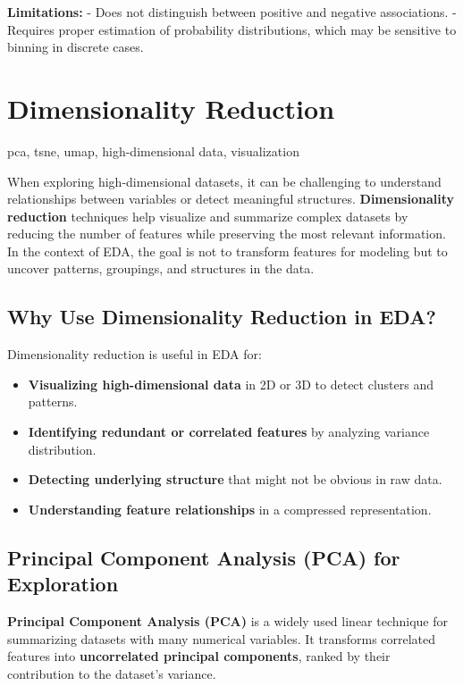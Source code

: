 \documentclass[12pt,openany]{book}
\begin{document}
\textbf{Limitations:}
- Does not distinguish between positive and negative associations.
- Requires proper estimation of probability distributions, which may be sensitive to binning in discrete cases.
\newline




\section{Dimensionality Reduction}

\begin{keywordsbox}
pca, tsne, umap, high-dimensional data, visualization
\end{keywordsbox}

When exploring high-dimensional datasets, it can be challenging to understand relationships between variables or detect meaningful structures. \textbf{Dimensionality reduction} techniques help visualize and summarize complex datasets by reducing the number of features while preserving the most relevant information. In the context of EDA, the goal is not to transform features for modeling but to uncover patterns, groupings, and structures in the data.

\subsection{Why Use Dimensionality Reduction in EDA?}

Dimensionality reduction is useful in EDA for:
\begin{itemize}
    \item \textbf{Visualizing high-dimensional data} in 2D or 3D to detect clusters and patterns.
    \item \textbf{Identifying redundant or correlated features} by analyzing variance distribution.
    \item \textbf{Detecting underlying structure} that might not be obvious in raw data.
    \item \textbf{Understanding feature relationships} in a compressed representation.
\end{itemize}

\subsection{Principal Component Analysis (PCA) for Exploration}

\textbf{Principal Component Analysis (PCA)} is a widely used linear technique for summarizing datasets with many numerical variables. It transforms correlated features into \textbf{uncorrelated principal components}, ranked by their contribution to the dataset’s variance.
\end{document}
